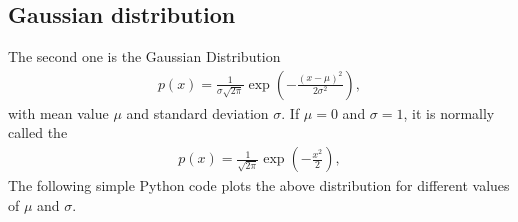 \documentclass[letterpaper,10pt,english]{sphinxmanual}
\begin{document}
\subsection{Gaussian distribution}
\label{\detokenize{chapter2:gaussian-distribution}}
The second one is the Gaussian Distribution
\begin{equation*}
\begin{split}
p(x) = \frac{1}{\sigma\sqrt{2\pi}} \exp{(-\frac{(x-\mu)^2}{2\sigma^2})},
\end{split}
\end{equation*}
with mean value \(\mu\) and standard deviation \(\sigma\). If \(\mu=0\) and \(\sigma=1\), it is normally called the 
\begin{equation*}
\begin{split}
p(x) = \frac{1}{\sqrt{2\pi}} \exp{(-\frac{x^2}{2})},
\end{split}
\end{equation*}
The following simple Python code plots the above distribution for different values of \(\mu\) and \(\sigma\).
\end{document}
